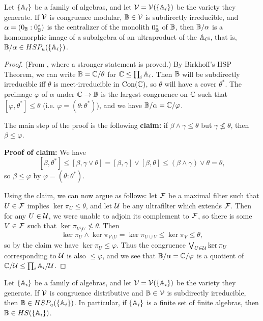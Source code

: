 \documentclass[letterpaper,11pt]{article}
\DeclareMathOperator{\Con}{Con}
\begin{document}
\begin{thm}\label{jonsson-modular} Let $\{\mathbb{A}_i\}$ be a family of algebras, and let $\mathcal{V} = \mathcal{V}(\{\mathbb{A}_i\})$ be the variety they generate. If $\mathcal{V}$ is congruence modular, $\mathbb{B} \in \mathcal{V}$ is subdirectly irreducible, and $\alpha = (0_{\mathbb{B}} : 0_{\mathbb{B}}^*)$ is the centralizer of the monolith $0_{\mathbb{B}}^*$ of $\mathbb{B}$, then $\mathbb{B}/\alpha$ is a homomorphic image of a subalgebra of an ultraproduct of the $\mathbb{A}_i$s, that is, $\mathbb{B}/\alpha \in HSP_u(\{\mathbb{A}_i\})$.
\end{thm}
\begin{proof} (From \cite{commutator-theory}, where a stronger statement is proved.) By Birkhoff's HSP Theorem, we can write $\mathbb{B} = \mathbb{C}/\theta$ for $\mathbb{C} \le \prod_i \mathbb{A}_i$. Then $\mathbb{B}$ will be subdirectly irreducible iff $\theta$ is meet-irreducible in $\Con(\bC)$, so $\theta$ will have a cover $\theta^*$. The preimage $\varphi$ of $\alpha$ under $\mathbb{C} \rightarrow \mathbb{B}$ is the largest congruence on $\mathbb{C}$ such that $[\varphi,\theta^*] \le \theta$ (i.e. $\varphi = (\theta:\theta^*)$), and we have $\mathbb{B}/\alpha = \mathbb{C}/\varphi$.

The main step of the proof is the following {\bf claim:} if $\beta \wedge \gamma \le \theta$ but $\gamma \not\le \theta$, then $\beta \le \varphi$.

{\bf Proof of claim:} We have
\[
[\beta,\theta^*] \le [\beta,\gamma\vee\theta] = [\beta,\gamma]\vee [\beta,\theta] \le (\beta \wedge \gamma) \vee \theta = \theta,
\]
so $\beta \le \varphi$ by $\varphi = (\theta:\theta^*)$.

Using the claim, we can now argue as follows: let $\mathcal{F}$ be a maximal filter such that $U \in \mathcal{F}$ implies $\ker \pi_U \le \theta$, and let $\mathcal{U}$ be any ultrafilter which extends $\mathcal{F}$. Then for any $U \in \mathcal{U}$, we were unable to adjoin its complement to $\mathcal{F}$, so there is some $V \in \mathcal{F}$ such that $\ker \pi_{V\setminus U} \not\le \theta$. Then
\[
\ker \pi_U \wedge \ker \pi_{V\setminus U} = \ker \pi_{U\cup V} \le \ker \pi_V \le \theta,
\]
so by the claim we have $\ker \pi_U \le \varphi$. Thus the congruence $\bigvee_{U \in \mathcal{U}} \ker \pi_U$ corresponding to $\mathcal{U}$ is also $\le \varphi$, and we see that $\mathbb{B}/\alpha = \mathbb{C}/\varphi$ is a quotient of $\mathbb{C}/\mathcal{U} \le \prod_i \mathbb{A}_i/\mathcal{U}$.
\end{proof}

\begin{cor} Let $\{\mathbb{A}_i\}$ be a family of algebras, and let $\mathcal{V} = \mathcal{V}(\{\mathbb{A}_i\})$ be the variety they generate. If $\mathcal{V}$ is congruence distributive and $\mathbb{B} \in \mathcal{V}$ is subdirectly irreducible, then $\mathbb{B} \in HSP_u(\{\mathbb{A}_i\})$. In particular, if $\{\mathbb{A}_i\}$ is a finite set of finite algebras, then $\mathbb{B} \in HS(\{\mathbb{A}_i\})$.
\end{cor}
\end{document}
